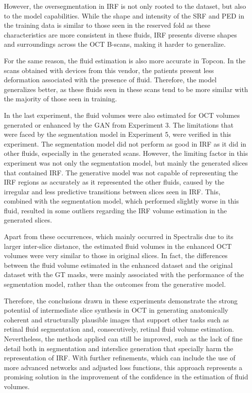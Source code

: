 \par
However, the oversegmentation in IRF is not only rooted to the dataset, but also to the model capabilities. While the shape and intensity of the SRF and PED in the training data is similar to those seen in the reserved fold as these characteristics are more consistent in these fluids, IRF presents diverse shapes and surroundings across the OCT B-scans, making it harder to generalize.
\par
For the same reason, the fluid estimation is also more accurate in Topcon. In the scans obtained with devices from this vendor, the patients present less deformation associated with the presence of fluid. Therefore, the model generalizes better, as these fluids seen in these scans tend to be more similar with the majority of those seen in training.
\par
In the last experiment, the fluid volumes were also estimated for OCT volumes generated or enhanced by the GAN from Experiment 3. The limitations that were faced by the segmentation model in Experiment 5, were verified in this experiment. The segmentation model did not perform as good in IRF as it did in other fluids, especially in the generated scans. However, the limiting factor in this experiment was not only the segmentation model, but mainly the generated slices that contained IRF. The generative model was not capable of representing the IRF regions as accurately as it represented the other fluids, caused by the irregular and less predictive transitions between slices seen in IRF. This, combined with the segmentation model, which performed slightly worse in this fluid, resulted in some outliers regarding the IRF volume estimation in the generated slices.
\par
Apart from these occurrences, which mainly occurred in Spectralis due to its larger inter-slice distance, the estimated fluid volumes in the enhanced OCT volumes were very similar to those in original slices. In fact, the differences between the fluid volume estimated in the enhanced dataset and the original dataset with the GT masks, were mainly associated with the performance of the segmentation model, rather than the outcomes from the generative model.
\par
Therefore, the conclusions drawn in these experiments demonstrate the strong potential of intermediate slice synthesis in OCT in generating anatomically coherent and structurally plausible images that support other tasks such as retinal fluid segmentation and, consecutively, retinal fluid volume estimation. Nevertheless, the methods applied can still be improved, such as the lack of fine detail both in segmentation and interslice generation that specially harm the representation of IRF. With further refinements, which can include the use of more advanced networks and adjusted loss functions, this approach represents a promising solution in the improvement of the confidence in the estimation of fluid volumes.
